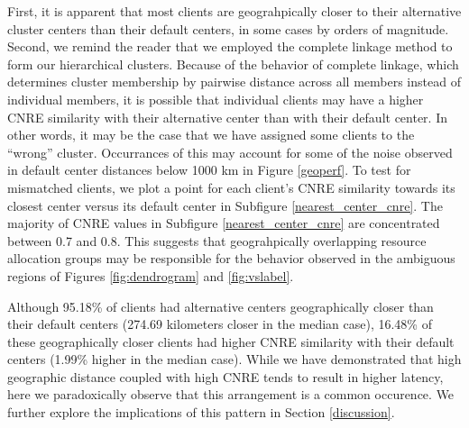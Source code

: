 First, it is apparent that most clients are geograhpically closer to their
alternative cluster centers than their default centers, in some cases by orders
of magnitude. Second, we remind the reader that we employed the complete linkage
method to form our hierarchical clusters. Because of the behavior of complete
linkage, which determines cluster membership by pairwise distance across all
members instead of individual members, it is possible that individual clients
may have a higher CNRE similarity with their alternative center than with their
default center. In other words, it may be the case that we have assigned some
clients to the ``wrong'' cluster. Occurrances of this may account for some of
the noise observed in default center distances below 1000 km in Figure
\ref{geoperf}. To test for mismatched clients, we plot a point for each client's CNRE similarity
towards its closest center versus its default center in Subfigure
\ref{nearest_center_cnre}. The majority of CNRE
values in Subfigure \ref{nearest_center_cnre} are concentrated between 0.7 and
0.8. This suggests that geograhpically overlapping resource allocation groups
may be responsible for the behavior observed in the ambiguous regions of Figures
\ref{fig:dendrogram} and \ref{fig:vslabel}. 

Although 95.18\% of clients had alternative centers geographically closer than
their default centers (274.69 kilometers closer in the median case), 16.48\% of
these geographically closer 
clients had higher CNRE similarity with their default centers (1.99\% higher in
the median case). While we have demonstrated that high geographic distance
coupled with high CNRE tends to result in higher latency, here we paradoxically
observe that this arrangement is a common occurence. We further explore the
implications of this pattern in Section \ref{discussion}.
